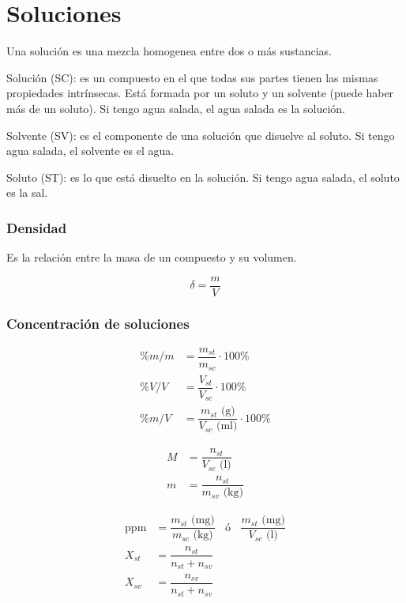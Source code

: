 \section{Soluciones}

Una solución es una mezcla homogenea entre dos o más sustancias.

Solución (SC): es un compuesto en el que todas sus partes tienen las mismas propiedades intrínsecas. Está formada por un soluto y un solvente (puede haber más de un soluto). Si tengo agua salada, el agua salada es la solución.
    
Solvente (SV): es el componente de una solución que disuelve al soluto. Si tengo agua salada, el solvente es el agua.
    
Soluto (ST): es lo que está disuelto en la solución. Si tengo agua salada, el soluto es la sal.

\subsubsection*{Densidad}

Es la relación entre la masa de un compuesto y su volumen.

$$\delta = \dfrac{m}{V}$$

\subsubsection*{Concentración de soluciones}

\vspace{-10mm}
\begin{multicols}{3}
\begin{align*}
    \% m/m &= \dfrac{ m_{st}}{ m_{sc}} \cdot 100\%\\
    \% V/V &= \dfrac{ V_{st}}{ V_{sc}} \cdot 100\%\\
    \% m/V &= \dfrac{ m_{st} \text{ (g)}}{ V_{sc} \text{ (ml)}} \cdot 100\%
\end{align*}   

\begin{align*}
    M &= \dfrac{n_{st}}{V_{sc} \text{ (l)}}\\
    m &= \dfrac{n_{st}}{m_{sv}  \text{ (kg)}}
\end{align*}

\begin{align*}
    \text{ppm} &= \dfrac{m_{st} \text{ (mg)}}{ m_{sc}  \text{ (kg)}} \;\;\text{ ó }\;\; \dfrac{m_{st} \text{ (mg)}}{ V_{sc} \text{ (l)} }\\
    X_{st} &= \dfrac{n_{st}}{n_{st} + n_{sv}}\\
    X_{sv} &= \dfrac{n_{sv}}{n_{st} + n_{sv}}
\end{align*}
    
\end{multicols}

